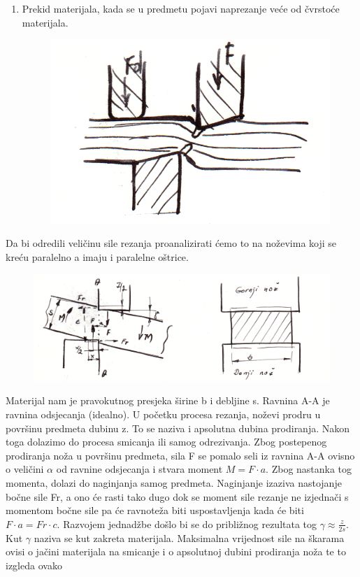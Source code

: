 \documentclass[a4paper,12pt]{article}
\numberwithin{figure}{section}
\begin{document}
\begin{enumerate}
\begin{figure}[!h]
\end{figure}
\FloatBarrier
\item Prekid materijala, kada se u predmetu pojavi naprezanje veće od čvrstoće materijala. 
\begin{figure}[!h]
\centering
\includegraphics[scale=0.15]{image_53-3.png}
\end{figure}
\FloatBarrier
\end{enumerate}
Da bi odredili veličinu sile rezanja proanalizirati ćemo to na noževima koji se kreću paralelno a imaju i paralelne oštrice.
\begin{figure}[!h]
\centering
\includegraphics[scale=0.15]{image_53-4.png}
\end{figure}
\FloatBarrier
Materijal nam je pravokutnog presjeka širine b i debljine s. Ravnina A-A je ravnina odsjecanja (idealno). U početku procesa rezanja, noževi prodru u površinu predmeta dubinu z. To se naziva i apsolutna dubina prodiranja. Nakon toga dolazimo do procesa smicanja ili samog odrezivanja. Zbog postepenog prodiranja noža u površinu predmeta, sila F se pomalo seli iz ravnina A-A ovisno o veličini $\alpha$ od ravnine odsjecanja i stvara moment $M = F \cdot a$. Zbog nastanka tog momenta, dolazi do naginjanja samog predmeta. Naginjanje izaziva nastojanje bočne sile Fr, a ono će rasti tako dugo dok se moment sile rezanje ne izjednači s momentom bočne sile pa će ravnoteža biti uspostavljenja kada će biti $F\cdot a = Fr \cdot c$. Razvojem jednadžbe došlo bi se do približnog rezultata tog $\gamma\approx\frac{z}{2 s}$. Kut $\gamma$ naziva se kut zakreta materijala. Maksimalna vrijednost sile na škarama ovisi o jačini materijala na smicanje i o apsolutnoj dubini prodiranja noža te to izgleda ovako
\end{document}
